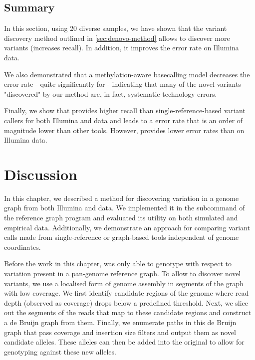 \subsection{Summary}

In this section, using 20 diverse \ecoli{} samples, we have shown that the \denovo{} variant discovery method outlined in \autoref{sec:denovo-method} allows \pandora{} to discover more variants (increases recall). In addition, it improves the error rate on Illumina data.

We also demonstrated that a methylation-aware \ont{} basecalling model decreases the \pandora{} error rate - quite significantly for \denovo{} - indicating that many of the novel variants "discovered" by our method are, in fact, systematic technology errors.

Finally, we show that \pandora{} provides higher recall than single-reference-based variant callers for both Illumina and \ont{} data and leads to a \ont{} error rate that is an order of magnitude lower than other tools. However,  provides lower error rates than \pandora{} on Illumina data.

\section{Discussion}
\label{sec:denovo-discussion}

In this chapter, we described a method for discovering \denovo{} variation in a genome graph from both Illumina and \ont{} data. We implemented it in the  subcommand of the reference graph program \pandora{} and evaluated its utility on both simulated and empirical data. Additionally, we demonstrate an approach for comparing variant calls made from single-reference or graph-based tools independent of genome coordinates.

Before the work in this chapter, \pandora{} was only able to genotype with respect to variation present in a pan-genome reference graph. To allow \pandora{} to discover novel variants, we use a localised form of genome assembly in segments of the graph with low \kmer{} coverage. We first identify candidate regions of the genome where read depth (observed as \kmer{} coverage) drops below a predefined threshold. Next, we slice out the segments of the reads that map to these candidate regions and construct a de Bruijn graph from them. Finally, we enumerate paths in this de Bruijn graph that pass coverage and insertion size filters and output them as novel candidate alleles. These alleles can then be added into the original \panrg{} to allow for genotyping against these new alleles.

